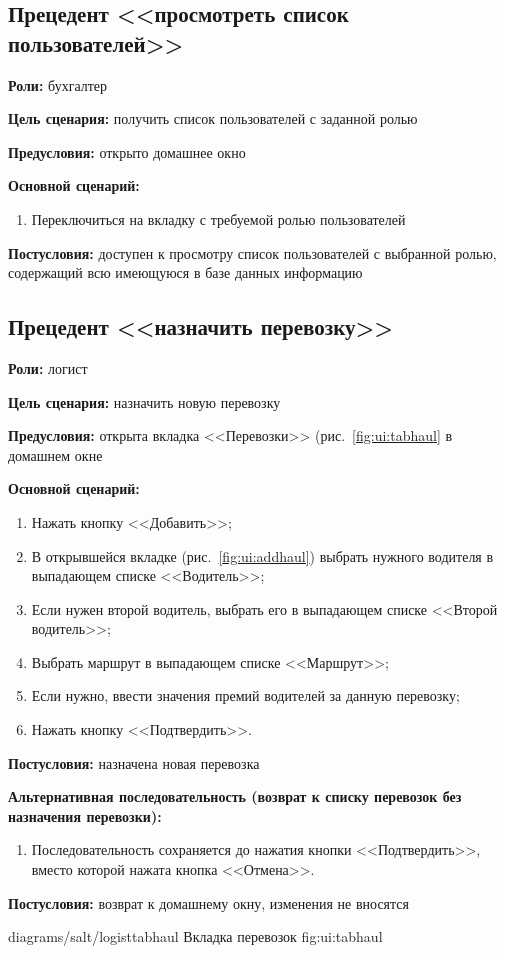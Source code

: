 \subsection{Прецедент <<просмотреть список пользователей>>}
\textbf{Роли:} бухгалтер \par
\textbf{Цель сценария:} получить список пользователей с заданной ролью \par 
\textbf{Предусловия:} открыто домашнее окно \par
\textbf{Основной сценарий:} 
\begin{enumerate}
    \item Переключиться на вкладку с требуемой ролью пользователей
\end{enumerate} \par
\textbf{Постусловия:} доступен к просмотру список пользователей
    с выбранной ролью, содержащий всю имеющуюся в базе данных информацию \par

\subsection{Прецедент <<назначить перевозку>>}
\textbf{Роли:} логист \par
\textbf{Цель сценария:} назначить новую перевозку \par
\textbf{Предусловия:} открыта вкладка <<Перевозки>> 
    (рис.~\ref{fig:ui:tabhaul} в домашнем окне \par
\textbf{Основной сценарий:} 
\begin{enumerate}
    \item Нажать кнопку <<Добавить>>;
    \item В открывшейся вкладке (рис.~\ref{fig:ui:addhaul}) 
        выбрать нужного водителя в выпадающем списке <<Водитель>>;
    \item Если нужен второй водитель, выбрать его
        в выпадающем списке <<Второй водитель>>;
    \item Выбрать маршрут в выпадающем списке <<Маршрут>>;
    \item Если нужно, ввести значения премий водителей за данную перевозку;
    \item Нажать кнопку <<Подтвердить>>.
\end{enumerate} \par
\textbf{Постусловия:} назначена новая перевозка \par
\textbf{Альтернативная последовательность 
    (возврат к списку перевозок без назначения перевозки):} \par
\begin{enumerate}
    \item Последовательность сохраняется до нажатия кнопки <<Подтвердить>>, 
        вместо которой нажата кнопка <<Отмена>>.
\end{enumerate} \par
\textbf{Постусловия:} возврат к домашнему окну, изменения не вносятся \par
\image
    {diagrams/salt/logisttabhaul}
    {Вкладка перевозок}
    {fig:ui:tabhaul}

